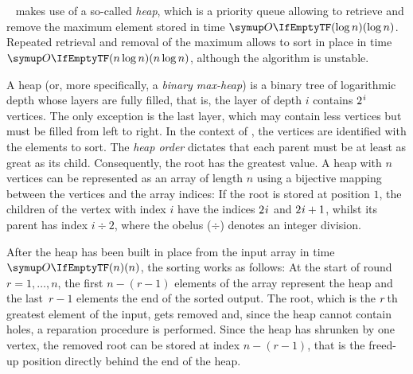 \section{\texorpdfstring{\HS{}}{HeapSort}}
\label{sec:tasklet:heap}

\HS{}~\cites{floyd1964treesort}{williams1964heapsort}[Section~2.2.5]{wirth1975algorithmen} makes use of a so-called \emph{heap}, which is a priority queue allowing to retrieve and remove the maximum element stored in time \(\bigoh{\log n}\).
Repeated retrieval and removal of the maximum allows to sort in place in time \(\bigoh{n \log n}\), although the algorithm is unstable.

A heap (or, more specifically, a \emph{binary max-heap}) is a binary tree of logarithmic depth whose layers are fully filled, that is, the layer of depth \(i\) contains \(2\mspace{1mu}^i\) vertices.
The only exception is the last layer, which may contain less vertices but must be filled from left to right.
In the context of \HS{}, the vertices are identified with the elements to sort.
The \emph{heap order} dictates that each parent must be at least as great as its child.
Consequently, the root has the greatest value.
A heap with \(n\) vertices can be represented as an array of length \(n\) using a bijective mapping between the vertices and the array indices:
If the root is stored at position \(1\), the children of the vertex with index \(i\) have the indices \(2 \mspace{1mu} i\) and \(2 \mspace{1mu} i + 1\), whilst its parent has index \(i \div 2\), where the obelus (\(\div\)) denotes an integer division.

After the heap has been built in place from the input array in time \(\bigoh{n}\), the sorting works as follows:
At the start of round~\(r = 1, \dots, n\), the first \(n - (r - 1)\) elements of the array represent the heap and the last~\(r - 1\) elements the end of the sorted output.
The root, which is the \(r\kern .125em\)th greatest element of the input, gets removed and, since the heap cannot contain holes, a reparation procedure is performed.
Since the heap has shrunken by one vertex, the removed root can be stored at index \(n - (r - 1)\), that is the freed-up position directly behind the end of the heap.






